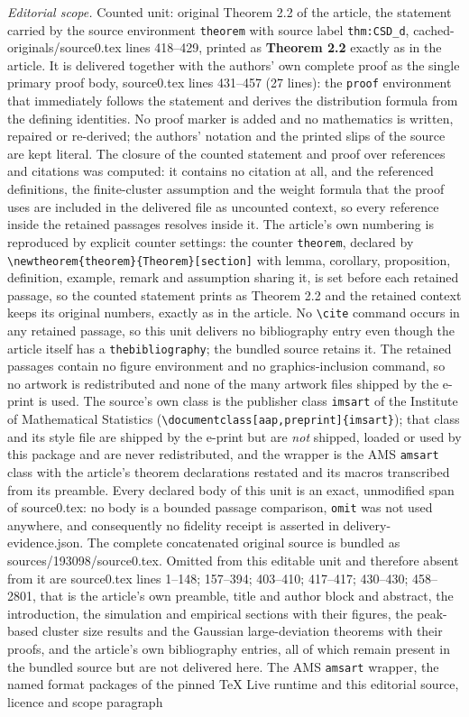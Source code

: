 \documentclass[10pt,a4paper]{amsart}
\theoremstyle{definition}
\begin{document}
\noindent\textit{Editorial scope.} Counted unit: original Theorem 2.2 of the article, the statement carried by the source environment \texttt{theorem} with source label \texttt{thm:CSD\_d}, cached-originals/source0.tex lines 418--429, printed as \textbf{Theorem 2.2} exactly as in the article. It is delivered together with the authors' own complete proof as the single primary proof body, source0.tex lines 431--457 (27 lines): the \texttt{proof} environment that immediately follows the statement and derives the distribution formula from the defining identities. No proof marker is added and no mathematics is written, repaired or re-derived; the authors' notation and the printed slips of the source are kept literal. The closure of the counted statement and proof over references and citations was computed: it contains no citation at all, and the referenced definitions, the finite-cluster assumption and the weight formula that the proof uses are included in the delivered file as uncounted context, so every reference inside the retained passages resolves inside it. The article's own numbering is reproduced by explicit counter settings: the counter \texttt{theorem}, declared by \texttt{\textbackslash newtheorem\{theorem\}\{Theorem\}[section]} with lemma, corollary, proposition, definition, example, remark and assumption sharing it, is set before each retained passage, so the counted statement prints as Theorem 2.2 and the retained context keeps its original numbers, exactly as in the article. No \texttt{\textbackslash cite} command occurs in any retained passage, so this unit delivers no bibliography entry even though the article itself has a \texttt{thebibliography}; the bundled source retains it. The retained passages contain no figure environment and no graphics-inclusion command, so no artwork is redistributed and none of the many artwork files shipped by the e-print is used. The source's own class is the publisher class \texttt{imsart} of the Institute of Mathematical Statistics (\texttt{\textbackslash documentclass[aap,preprint]\{imsart\}}); that class and its style file are shipped by the e-print but are \emph{not} shipped, loaded or used by this package and are never redistributed, and the wrapper is the AMS \texttt{amsart} class with the article's theorem declarations restated and its macros transcribed from its preamble. Every declared body of this unit is an exact, unmodified span of source0.tex: no body is a bounded passage comparison, \texttt{omit} was not used anywhere, and consequently no fidelity receipt is asserted in delivery-evidence.json. The complete concatenated original source is bundled as sources/193098/source0.tex. Omitted from this editable unit and therefore absent from it are source0.tex lines 1--148; 157--394; 403--410; 417--417; 430--430; 458--2801, that is the article's own preamble, title and author block and abstract, the introduction, the simulation and empirical sections with their figures, the peak-based cluster size results and the Gaussian large-deviation theorems with their proofs, and the article's own bibliography entries, all of which remain present in the bundled source but are not delivered here. The AMS \texttt{amsart} wrapper, the named format packages of the pinned TeX Live runtime and this editorial source, licence and scope paragraph 
\end{document}
